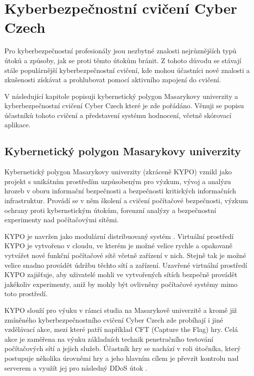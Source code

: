 \documentclass[
  digital,
  twoside,
  table, 
  nolof, 
  nolot
]{fithesis3}
\begin{document}
\chapter{Kyberbezpečnostní cvičení Cyber Czech}
\label{cyberex}

Pro kyberbezpečnostní profesionály jsou nezbytné znalosti nejrůznějších typů útoků a způsoby, jak se proti těmto útokům bránit. Z tohoto důvodu se stávají stále populárnější kyberbezpečnostní cvičení, kde mohou účastníci nové znalosti a zkušenosti získávat a prohlubovat pomocí aktivního zapojení do cvičení.

V následující kapitole popisuji kybernetický polygon Masarykovy univerzity a kyberbezpečnostní cvičení Cyber Czech které je zde pořádáno. Věnuji se popisu účastníků tohoto cvičení a představení systému hodnocení, včetně skórovací aplikace.

\section{Kybernetický polygon Masarykovy univerzity}

Kybernetický polygon Masarykovy univerzity (zkráceně KYPO) vznikl jako projekt s unikátním prostředím uzpůsobeným pro výzkum, vývoj a analýzu hrozeb v oboru informační bezpečnosti a bezpečnosti kritických informačních infrastruktur. Provádí se v něm školení a cvičení počítačové bezpečnosti, výzkum ochrany proti kybernetickým útokům, forenzní analýzy a bezpečnostní experimenty nad počítačovými sítěmi.

KYPO je navržen jako modulární distribuovaný systém \cite{Vykopal2017KYPOCases}. Virtuální prostředí KYPO je vytvořeno v cloudu, ve kterém je možné velice rychle a opakovaně vytvářet nové funkční počítačové sítě včetně zařízení v nich. Stejně tak je možné velice snadno provádět údržbu těchto sítí a zařízení. Uzavřené virtuální prostředí KYPO zajišťuje, aby uživatelé mohli ve vytvořených sítích bezpečně provádět jakékoliv experimenty, aniž by mohly být ovlivněny počítačové systémy mimo toto prostředí.

KYPO slouží pro výuku v rámci studia na Masarykově univerzitě a kromě již zmíněného kyberbezpečnostního cvičení Cyber Czech zde probíhají i jiné vzdělávací akce, mezi které patří například CFT (Capture the Flag) hry. Celá akce je zaměřena na výuku základních technik penetračního testování počítačových sítí a jejich služeb. Účastník hry se nachází v roli útočníka, který postupuje několika úrovněmi hry a jeho hlavním cílem je převzít kontrolu nad serverem a využít jej pro následný DDoS útok \cite{Cegan2015LessonsProject}.
\end{document}
